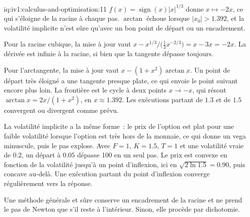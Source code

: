 \begin{solution}{iq:iv1:calculus-and-optimisation:11}
$f(x) = \operatorname{sign}(x)|x|^{1/3}$ donne $x \mapsto -2x$, ce qui s'éloigne de la racine à chaque pas. $\arctan$ échoue lorsque $|x_0| > 1.392$, et la volatilité implicite n'est sûre qu'avec un bon point de départ ou un encadrement.

Pour la racine cubique, la mise à jour vaut $x - x^{1/3}/\bigl(\frac13 x^{-2/3}\bigr) = x - 3x = -2x$. La dérivée est infinie à la racine, si bien que la tangente dépasse toujours.

Pour l'arctangente, la mise à jour vaut $x - (1 + x^2)\arctan x$. Un point de départ très éloigné a une tangente presque plate, ce qui envoie le point suivant encore plus loin. La frontière est le cycle à deux points $x \to -x$, qui résout $\arctan x = 2x/(1 + x^2)$, en $x \approx 1.392$. Les exécutions partant de $1.3$ et de $1.5$ convergent ou divergent comme prévu.

La volatilité implicite a la même forme~: le prix de l'option est plat pour une faible volatilité lorsque l'option est très hors de la monnaie, ce qui donne un vega minuscule, puis le pas explose. Avec $F = 1$, $K = 1.5$, $T = 1$ et une volatilité vraie de $0.2$, un départ à $0.05$ dépasse 100 en un seul pas. Le prix est convexe en fonction de la volatilité jusqu'à un point d'inflexion, ici en $\sqrt{2\ln 1.5} = 0.90$, puis concave au-delà. Une exécution partant du point d'inflexion converge régulièrement vers la réponse.

Une méthode générale et sûre conserve un encadrement de la racine et ne prend le pas de Newton que s'il reste à l'intérieur. Sinon, elle procède par dichotomie.



\end{solution}


